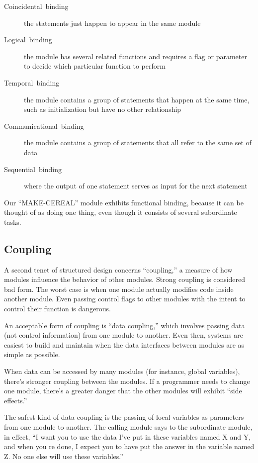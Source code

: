 \begin{description}
\item [Coincidental~binding]the statements just happen to appear in the
same module
\item [Logical~binding]the module has several related functions and requires
a flag or parameter to decide which particular function to perform
\item [Temporal~binding]the module contains a group of statements that
happen at the same time, such as initialization but have no other
relationship
\item [Communicational~binding]the module contains a group of statements
that all refer to the same set of data
\item [Sequential~binding]where the output of one statement serves as
input for the next statement
\end{description}
Our {}``MAKE-CEREAL'' module exhibits functional binding, because
it can be thought of as doing one thing, even though it consists of
several subordinate tasks.


\subsection{Coupling}
A second tenet of structured design concerns {}``coupling,'' a measure
of how modules influence the behavior of other modules. Strong coupling
is considered bad form. The worst case is when one module actually
modifies code inside another module. Even passing control flags to
other modules with the intent to control their function is dangerous.

An acceptable form of coupling is {}``data coupling,'' which involves
passing data (not control information) from one module to another.
Even then, systems are easiest to build and maintain when the data
interfaces between modules are as simple as possible.

When data can be accessed by many modules (for instance, global variables),
there's stronger coupling between the modules. If a programmer needs
to change one module, there's a greater danger that the other modules
will exhibit {}``side effects.''

The safest kind of data coupling is the passing of local variables
as parameters from one module to another. The calling module says
to the subordinate module, in effect, {}``I want you to use the data
I've put in these variables named X and Y, and when you re done, I
expect you to have put the answer in the variable named Z. No one
else will use these variables.''

